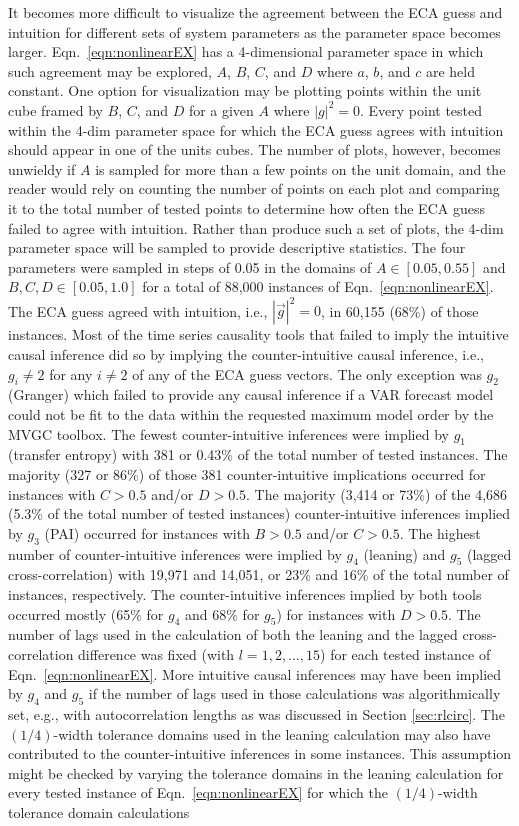 \documentclass{article}[10pt]
\begin{document}
It becomes more difficult to visualize the agreement between the ECA guess and intuition for different sets of system parameters as the parameter space becomes larger.  Eqn.\ \ref{eqn:nonlinearEX} has a 4-dimensional parameter space in which such agreement may be explored, $A$, $B$, $C$, and $D$ where $a$, $b$, and $c$ are held constant.  One option for visualization may be plotting points within the unit cube framed by $B$, $C$, and $D$ for a given $A$ where $|g|^2 = 0$.  Every point tested within the 4-dim parameter space for which the ECA guess agrees with intuition should appear in one of the units cubes.  The number of plots, however, becomes unwieldy if $A$ is sampled for more than a few points on the unit domain, and the reader would rely on counting the number of points on each plot and comparing it to the total number of tested points to determine how often the ECA guess failed to agree with intuition.  Rather than produce such a set of plots, the 4-dim parameter space will be sampled to provide descriptive statistics.  The four parameters were sampled in steps of 0.05 in the domains of $A\in[0.05,0.55]$ and $B,C,D\in[0.05,1.0]$ for a total of 88,000 instances of Eqn.\ \ref{eqn:nonlinearEX}.  The ECA guess agreed with intuition, i.e., $|\vec{g}|^2=0$, in 60,155 (68\%) of those instances.  Most of the time series causality tools that failed to imply the intuitive causal inference did so by implying the counter-intuitive causal inference, i.e., $g_i\neq 2$ for any $i\neq 2$ of any of the ECA guess vectors.  The only exception was $g_2$ (Granger) which failed to provide any causal inference if a VAR forecast model could not be fit to the data within the requested maximum model order by the MVGC toolbox.  The fewest counter-intuitive inferences were implied by $g_1$ (transfer entropy) with 381 or 0.43\% of the total number of tested instances.  The majority (327 or 86\%) of those 381 counter-intuitive implications occurred for instances with $C>0.5$ and/or $D>0.5$.  The majority (3,414 or 73\%) of the 4,686 (5.3\% of the total number of tested instances) counter-intuitive inferences implied by $g_3$ (PAI) occurred for instances with $B>0.5$ and/or $C>0.5$.  The highest number of counter-intuitive inferences were implied by $g_4$ (leaning) and $g_5$ (lagged cross-correlation) with 19,971 and 14,051, or 23\% and 16\% of the total number of instances, respectively.  The counter-intuitive inferences implied by both tools occurred mostly (65\% for $g_4$ and 68\% for $g_5$) for instances with $D>0.5$.  The number of lags used in the calculation of both the leaning and the lagged cross-correlation difference was fixed (with $l=1,2,\ldots,15$) for each tested instance of Eqn.\ \ref{eqn:nonlinearEX}.  More intuitive causal inferences may have been implied by $g_4$ and $g_5$ if the number of lags used in those calculations was algorithmically set, e.g., with autocorrelation lengths as was discussed in Section \ref{sec:rlcirc}.  The $(1/4)$-width tolerance domains used in the leaning calculation may also have contributed to the counter-intuitive inferences in some instances. This assumption might be checked by varying the tolerance domains in the leaning calculation for every tested instance of Eqn.\ \ref{eqn:nonlinearEX} for which the $(1/4)$-width tolerance domain calculations 
\end{document}
